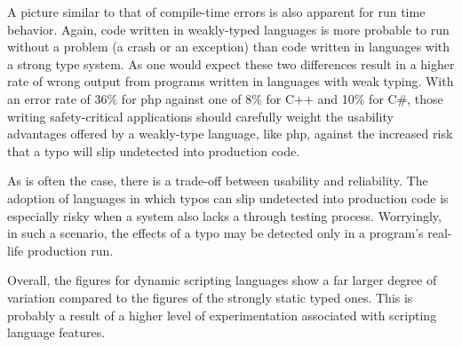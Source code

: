 \documentclass[10pt]{sigplanconf}
\begin{document}
A picture similar to that of compile-time errors
is also apparent for run time behavior.
Again, code written in weakly-typed languages is more probable to run without
a problem (a crash or an exception)
than code written in languages with a strong type system.
As one would expect these two differences result in a higher rate of
wrong output from programs written in languages with weak typing.
With an error rate of 36\% for {\sc php} against one of 8\% for
C++ and 10\% for C\#,
those writing safety-critical applications should carefully
weight the usability advantages offered by a weakly-type language,
like {\sc php}, against the increased risk that a typo
will slip undetected into production code.

As is often the case,
there is a trade-off between usability and reliability.
The adoption of languages in which typos can slip undetected
into production code is especially risky when a system also lacks
a through testing process.
Worryingly, in such a scenario, the effects of a typo may be
detected only in a program's real-life production run.

Overall, the figures for dynamic scripting languages show a far larger
degree of variation compared to the figures of the strongly static typed
ones.
This is probably a result of a higher level of experimentation
associated with scripting language features.
\end{document}
